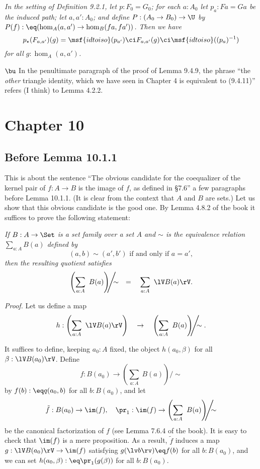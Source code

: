 \documentclass[12pt]{article}
\begin{document}
\emph{In the setting of Definition 9.2.1, let $p:F_0=G_0$; for each $a:A_0$ let $p_a:Fa=Ga$ be the induced path; let $a,a':A_0$; and define $P:(A_0\to B_0)\to\U$ by $P(f):\eq(\hom_A(a,a')\to\hom_B(fa,fa'))$. Then we have} 
$$
p_\star(F_{a,a'})(g)=\msf{idtoiso}(p_{a'})\ci F_{a,a'}(g)\ci\msf{idtoiso}((p_a)^{-1})
$$ 
\emph{for all $g:\hom_A(a,a')$.}

\nn$\bu$ In the penultimate paragraph of the proof of Lemma 9.4.9, the phrase ``the \emph{other} triangle identity, which we have seen in Chapter 4 is equivalent to (9.4.11)'' refers (I think) to Lemma 4.2.2.


\section{Chapter 10}

\subsection{Before Lemma 10.1.1}

This is about the sentence ``The obvious candidate for the coequalizer of the kernel pair of $f:A\to B$ is the image of $f$, as defined in \S7.6'' a few paragraphs before Lemma 10.1.1. (It is clear from the context that $A$ and $B$ are sets.) Let us show that this obvious candidate is the good one. By Lemma 4.8.2 of the book it suffices to prove the following statement:

\emph{If $B:A\to\Set$ is a set family over a set $A$ and $\sim$ is the equivalence relation $\sum_{a:A}B(a)$ defined by 
$$
(a,b)\sim(a',b')\text{ if and only if }a=a',
$$ 
then the resulting quotient satisfies}
$$
\left(\sum_{a:A}\ B(a)\right)\!\!\!\Bigg/\!\!\!\!\sim\quad=\quad\sum_{a:A}\ \lV B(a)\rV.
$$

\nn\emph{Proof.} Let us define a map 
$$
h:\left(\sum_{a:A}\ \lV B(a)\rV\right)\quad\to\quad\left(\sum_{a:A}\ B(a)\right)\!\!\!\Bigg/\!\!\!\!\sim.
$$ 

It suffices to define, keeping $a_0:A$ fixed, the object $h(a_0,\beta)$ for all $\beta:\lV B(a_0)\rV$. Define 
$$
f:B(a_0)\to\left(\sum_{a:A}\ B(a)\right)\!\!\!\Bigg/\!\!\!\!\sim
$$ 
by $f(b):\eq q(a_0,b)$ for all $b:B(a_0)$, and let 
$$
\tilde f:B(a_0)\to\im(f),\quad\pr_1:\im(f)\to\left(\sum_{a:A}\ B(a)\right)\!\!\!\Bigg/\!\!\!\!\sim
$$ 
be the canonical factorization of $f$ (see Lemma 7.6.4 of the book). It is easy to check that $\im(f)$ is a mere proposition. As a result, $\tilde f$ induces a map $g:\lV B(a_0)\rV\to\im(f)$ satisfying $g(\lv b\rv)\eq f(b)$ for all $b:B(a_0)$, and we can set $h(a_0,\beta):\eq\pr_1(g(\beta))$ for all $b:B(a_0)$.
\end{document}
